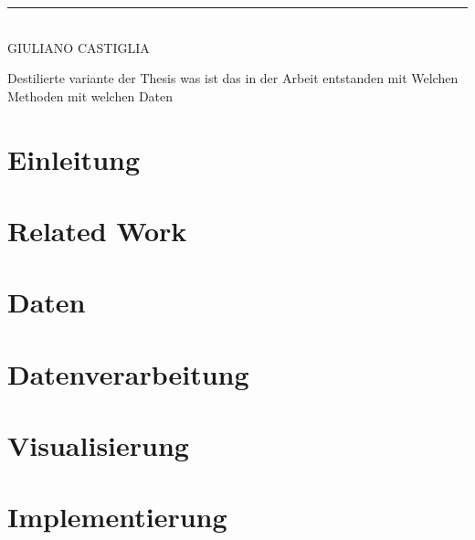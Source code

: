 \vspace{1cm}
\noindent\rule{5cm}{0.4pt}\\
GIULIANO CASTIGLIA

\clearpage


Destilierte variante der Thesis
was ist das in der Arbeit entstanden
mit Welchen Methoden
mit welchen Daten



\tableofcontents



\cleardoublepage
{} %


\chapter{Einleitung}
\label{chap:einleitung}


\chapter{Related Work}
\label{chap:related_work}


\chapter{Daten}
\label{chap:daten}


\chapter{Datenverarbeitung}
\label{chap:daten_ver}


\chapter{Visualisierung}
\label{chap:visualization}


\chapter{Implementierung}
\label{chap:Implementierung}


